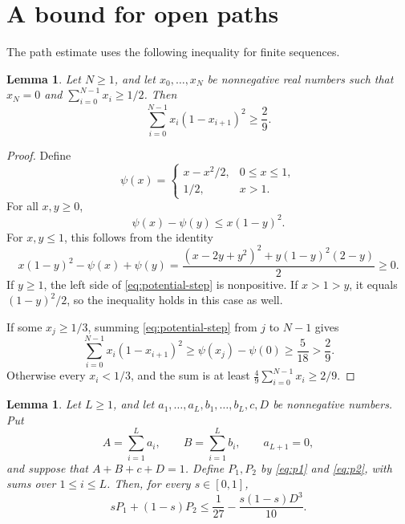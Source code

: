 \documentclass[11pt]{article}
\newtheorem{lemma}[theorem]{Lemma}
\numberwithin{equation}{section}
\begin{document}
\section{A bound for open paths}\label{sec:paths}

The path estimate uses the following inequality for finite sequences.

\begin{lemma}\label{lem:energy}
Let \(N\ge1\), and let \(x_0,\ldots,x_N\) be nonnegative real numbers
such that \(x_N=0\) and \(\sum_{i=0}^{N-1}x_i\ge1/2\). Then
\begin{equation}\label{eq:sequence-energy}
 \sum_{i=0}^{N-1}x_i(1-x_{i+1})^2\ge\frac29.
\end{equation}
\end{lemma}

\begin{proof}
Define
\[
 \psi(x)=
 \begin{cases}
 x-x^2/2,&0\le x\le1,\\
 1/2,&x>1.
 \end{cases}
\]
For all \(x,y\ge0\),
\begin{equation}\label{eq:potential-step}
 \psi(x)-\psi(y)\le x(1-y)^2.
\end{equation}
For \(x,y\le1\), this follows from the identity
\[
 x(1-y)^2-\psi(x)+\psi(y)
 =\frac{(x-2y+y^2)^2+y(1-y)^2(2-y)}2\ge0.
\]
If \(y\ge1\), the left side of \eqref{eq:potential-step} is
nonpositive. If \(x>1>y\), it equals \((1-y)^2/2\), so the
inequality holds in this case as well.

If some \(x_j\ge1/3\), summing \eqref{eq:potential-step} from
\(j\) to \(N-1\) gives
\[
 \sum_{i=0}^{N-1}x_i(1-x_{i+1})^2
 \ge\psi(x_j)-\psi(0)\ge\frac5{18}>\frac29.
\]
Otherwise every \(x_i<1/3\), and the sum is at least
\(\frac49\sum_{i=0}^{N-1}x_i\ge2/9\).
\end{proof}

\begin{lemma}\label{lem:cubic}
Let \(L\ge1\), and let \(a_1,\ldots,a_L,b_1,\ldots,b_L,c,D\)
be nonnegative numbers. Put
\[
 A=\sum_{i=1}^L a_i,\qquad B=\sum_{i=1}^L b_i,
 \qquad a_{L+1}=0,
\]
and suppose that \(A+B+c+D=1\). Define \(P_1,P_2\) by
\eqref{eq:p1} and \eqref{eq:p2}, with sums over \(1\le i\le L\).
Then, for every \(s\in[0,1]\),
\begin{equation}\label{eq:cubic-loss}
 sP_1+(1-s)P_2\le\frac1{27}-\frac{s(1-s)D^3}{10}.
\end{equation}
\end{lemma}
\end{document}
